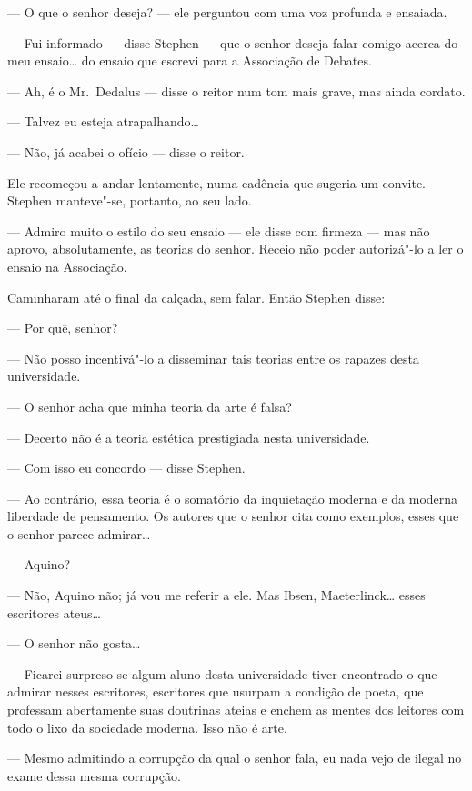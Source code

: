 --- O que o senhor deseja? --- ele perguntou com uma voz
profunda e ensaiada.

--- Fui informado --- disse Stephen --- que o senhor deseja falar
comigo acerca do meu ensaio\ldots{} do ensaio que escrevi para a Associação
de Debates.

--- Ah, é o Mr.~Dedalus --- disse o reitor num tom mais grave, mas
ainda cordato.

--- Talvez eu esteja atrapalhando\ldots{}

--- Não, já acabei o ofício --- disse o reitor.

Ele recomeçou a andar lentamente, numa cadência que sugeria um
convite.  Stephen manteve"-se, portanto, ao seu lado.

--- Admiro muito o estilo do seu ensaio --- ele disse com firmeza ---
mas não aprovo, absolutamente, as teorias do senhor.  Receio não poder
autorizá"-lo a ler o ensaio na Associação.

Caminharam até o final da calçada, sem falar.  Então Stephen disse:

--- Por quê, senhor?

--- Não posso incentivá"-lo a disseminar tais teorias entre os
rapazes desta universidade.

--- O senhor acha que minha teoria da arte é falsa?

--- Decerto não é a teoria estética prestigiada nesta
universidade.

--- Com isso eu concordo --- disse Stephen.

--- Ao contrário, essa teoria é o somatório da inquietação
moderna e da moderna liberdade de pensamento.  Os autores que o senhor
cita como exemplos, esses que o senhor parece admirar\ldots{}

--- Aquino?

--- Não, Aquino não; já vou me referir a ele.  Mas Ibsen,
Maeterlinck\ldots{} esses escritores ateus\ldots{}

--- O senhor não gosta\ldots{}

--- Ficarei surpreso se algum aluno desta universidade tiver
encontrado o que admirar nesses escritores, escritores que usurpam a
condição de poeta, que professam abertamente suas doutrinas ateias e
enchem as mentes dos leitores com todo o lixo da sociedade moderna.
Isso não é arte.

--- Mesmo admitindo a corrupção da qual o senhor fala, eu nada
vejo de ilegal no exame dessa mesma corrupção.

